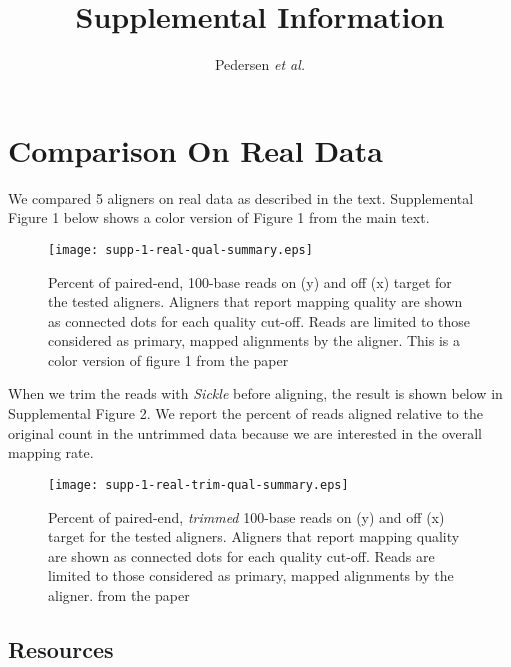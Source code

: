 \documentclass[12pt]{article}
\title{Supplemental Information}
\author{Pedersen \textit{et al.}}
\date{}
\begin{document}
\maketitle

\section{Comparison On Real Data}

We compared 5 aligners on real data as described in the text. Supplemental
Figure 1 below shows a color version of Figure 1 from the main text.

\begin{figure}[H]%
    \centerline{\texttt{[image: supp-1-real-qual-summary.eps]}}
    \caption{Percent of paired-end, 100-base reads on (y) and off (x) target for the tested aligners. Aligners that report mapping quality are shown as connected dots for each quality cut-off. Reads are limited to those considered as primary, mapped alignments by the aligner. This is a color version of figure 1
from the paper}\label{suppfig:01}
\end{figure}

When we trim the reads with \emph{Sickle} before aligning, the result is shown below in Supplemental Figure 2. We report the percent of reads aligned relative
to the original count in the untrimmed data because we are interested in the
overall mapping rate.

\begin{figure}[H]%
    \centerline{\texttt{[image: supp-1-real-trim-qual-summary.eps]}}
    \caption{Percent of paired-end, \emph{trimmed} 100-base reads on (y) and off (x) target for the tested aligners. Aligners that report mapping quality are shown as connected dots for each quality cut-off. Reads are limited to those considered as primary, mapped alignments by the aligner.
from the paper}\label{suppfig:02}
\end{figure}

\subsection{Resources}
\end{document}
